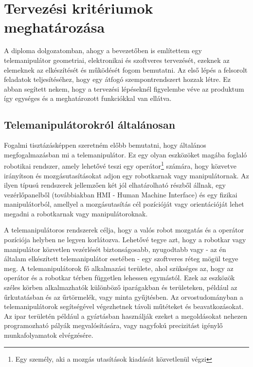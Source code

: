 \chapter{Tervezési kritériumok meghatározása}
\label{sec:LatexTools}

A diploma dolgozatomban, ahogy a bevezetőben is említettem egy telemanipulátor geometriai, elektronikai és szoftveres tervezését, ezeknek az elemeknek az elkészítését és működését fogom bemutatni. Az első lépés a felsorolt feladatok teljesítéséhez, hogy egy átfogó szempontrendszert hozzak létre. Ez abban segített nekem, hogy a tervezési lépéseknél figyelembe véve az produktum így egységes és a meghatározott funkciókkal van ellátva.  

\section{Telemanipulátorokról általánosan}

Fogalmi tisztázásképpen szeretném előbb bemutatni, hogy általános megfogalmazásban mi a telemanipulátor. Ez egy olyan eszközöket magába foglaló robotikai rendszer, amely lehetővé teszi egy operátor\footnote{Egy személy, aki a mozgás utasítások kiadását közvetlenül végzi} számára, hogy közvetve irányítson és mozgásutasításokat adjon egy robotkarnak vagy manipulátornak. Az ilyen típusú rendszerek jellemzően két jól elhatárolható részből állnak, egy vezérlőpanelből (továbbiakban HMI - Human Machine Interface) és egy fizikai manipulátorból, amellyel a mozgásutasítás cél pozícióját vagy orientációját lehet megadni a robotkarnak vagy manipulátoroknak.

A telemanipulátoros rendszerek célja, hogy a valós robot mozgatás és a operátor pozíciója helyben ne legyen korlátozva. Lehetővé tegye azt, hogy a robotkar vagy manipulátor közvetlen vezérlését biztonságosabb, nyugodtabb vagy - az én általam elkészített telemanipulátor esetében - egy szoftveres réteg mögül tegye meg. A telemanipulátorok fő alkalmazási területe, ahol szükséges az, hogy az operátor és a robotkar térben független lehessen egymástól. Ezek az eszközök széles körben alkalmazhatók különböző iparágakban és területeken, például az űrkutatásban és az űrtörmelék, vagy minta gyűjtésben. Az orvostudományban a telemanipulátorok segítségével végezhetnek távoli műtéteket és beavatkozásokat. Az ipar területén például a gyártásban használják ezeket a megoldásokat nehezen programozható pályák megvalósítására, vagy nagyfokú precizitást igénylő munkafolyamatok elvégzésére.

